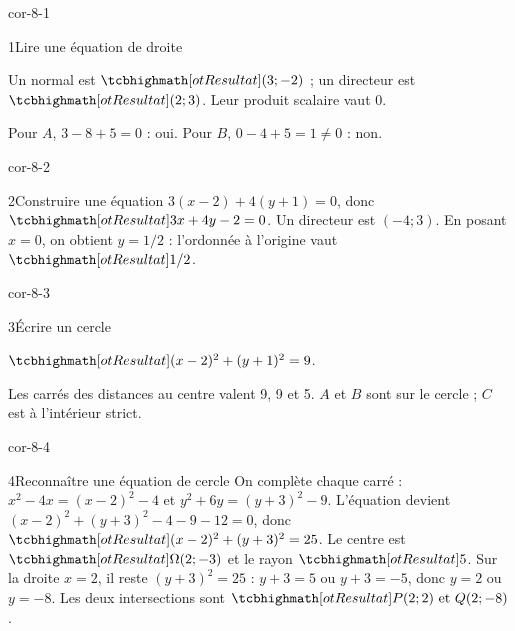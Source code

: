 \corrigesSouples


\begin{blocLivre}{cor-8-1}
\begin{corrige}{1}{Lire une équation de droite}
\begin{questions}
\item Un normal est $\res{(3;-2)}$ ; un directeur est $\res{(2;3)}$. Leur produit scalaire vaut 0.
\item Pour $A$, $3-8+5=0$ : oui. Pour $B$, $0-4+5=1\neq0$ : non.
\end{questions}

\label{figgeo-08-01-cor}
\end{corrige}
\end{blocLivre}
\begin{blocLivre}{cor-8-2}
\begin{corrige}{2}{Construire une équation}
$3(x-2)+4(y+1)=0$, donc $\res{3x+4y-2=0}$. Un directeur est $(-4;3)$. En posant $x=0$, on obtient $y=1/2$ : l’ordonnée à l’origine vaut $\res{1/2}$.
\label{figgeo-08-02-cor}
\end{corrige}
\end{blocLivre}
\begin{blocLivre}{cor-8-3}
\begin{corrige}{3}{Écrire un cercle}
\begin{questions}
\item $\res{(x-2)^2+(y+1)^2=9}$.
\item Les carrés des distances au centre valent 9, 9 et 5. $A$ et $B$ sont sur le cercle ; $C$ est à l’intérieur strict.
\end{questions}

\label{figgeo-08-03-cor}
\end{corrige}
\end{blocLivre}
\begin{blocLivre}{cor-8-4}
\begin{corrige}{4}{Reconnaître une équation de cercle}
On complète chaque carré :
$x^2-4x=(x-2)^2-4$ et $y^2+6y=(y+3)^2-9$.
L’équation devient $(x-2)^2+(y+3)^2-4-9-12=0$, donc
$\res{(x-2)^2+(y+3)^2=25}$.
Le centre est $\res{\Omega(2;-3)}$ et le rayon $\res{5}$.
Sur la droite $x=2$, il reste $(y+3)^2=25$ :
$y+3=5$ ou $y+3=-5$, donc $y=2$ ou $y=-8$.
Les deux intersections sont $\res{P(2;2)\text{ et }Q(2;-8)}$.
\label{figgeo-08-04-cor}
\end{corrige}
\end{blocLivre}
